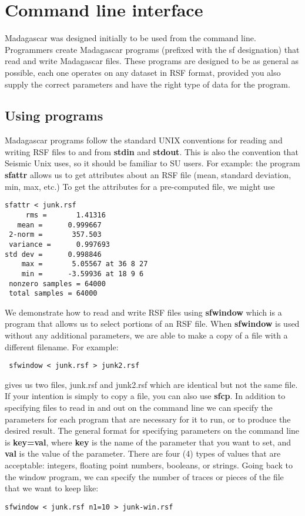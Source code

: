 \section{Command line interface}
Madagascar was designed initially to be used from the command line. Programmers create Madagascar programs (prefixed with the sf designation) that read and write Madagascar files. These programs are designed to be as general as possible, each one operates on any dataset in RSF format, provided you also supply the correct parameters and have the right type of data for the program. 

\subsection{Using programs}
Madagascar programs follow the standard UNIX conventions for reading and writing RSF files to and from \textbf{stdin} and \textbf{stdout}. This is also the convention that Seismic Unix uses, so it should be familiar to SU users.
For example: the program \textbf{sfattr} allows us to get attributes about an RSF file (mean, standard deviation, min, max, etc.) To get the attributes for a pre-computed file, we might use
\begin{verbatim}
sfattr < junk.rsf
     rms =       1.41316 
   mean =      0.999667 
 2-norm =       357.503 
 variance =      0.997693 
std dev =      0.998846 
    max =       5.05567 at 36 8 27 
    min =      -3.59936 at 18 9 6 
 nonzero samples = 64000 
 total samples = 64000 
 \end{verbatim}
We demonstrate how to read and write RSF files using \textbf{sfwindow} which is a program that allows us to select portions of an RSF file. When \textbf{sfwindow} is used without any additional parameters, we are able to make a copy of a file with a different filename. For example:
\begin{verbatim}
 sfwindow < junk.rsf > junk2.rsf
 \end{verbatim}
gives us two files, junk.rsf and junk2.rsf which are identical but not the same file. If your intention is simply to copy a file, you can also use \textbf{sfcp}.
In addition to specifying files to read in and out on the command line we can specify the parameters for each program that are necessary for it to run, or to produce the desired result. The general format for specifying parameters on the command line is \textbf{key=val}, where \textbf{key} is the name of the parameter that you want to set, and \textbf{val} is the value of the parameter. There are four (4) types of values that are acceptable: integers, floating point numbers, booleans, or strings. Going back to the window program, we can specify the number of traces or pieces of the file that we want to keep like:
\begin{verbatim}
sfwindow < junk.rsf n1=10 > junk-win.rsf
\end{verbatim}

